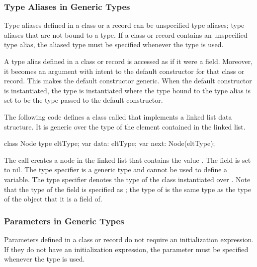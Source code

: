 \subsubsection{Type Aliases in Generic Types}
\label{Type_Aliases_in_Generic_Types}

Type aliases defined in a class or a record can be unspecified type
aliases; type aliases that are not bound to a type.  If a class or
record contains an unspecified type alias, the aliased type must be
specified whenever the type is used.

A type alias defined in a class or record is accessed as if it were a
field.  Moreover, it becomes an argument with intent  to
the default constructor for that class or record.  This makes the
default constructor generic.  When the default constructor is
instantiated, the type is instantiated where the type bound to the
type alias is set to be the type passed to the default constructor.

\begin{example}
The following code defines a class called  that implements
a linked list data structure.  It is generic over the type of the
element contained in the linked list.
\begin{chapel}
class Node {
  type eltType;
  var data: eltType;
  var next: Node(eltType);
}
\end{chapel}
The call  creates a node in the linked list
that contains the value .  The  field is set to
nil.  The type specifier  is a generic type and cannot be
used to define a variable.  The type specifier 
denotes the type of the  class instantiated over
.  Note that the type of the  field is specified
as ; the type of  is the same type as
the type of the object that it is a field of.
\end{example}

\subsubsection{Parameters in Generic Types}
\label{Parameters_in_Generic_Types}

Parameters defined in a class or record do not require an
initialization expression.  If they do not have an initialization
expression, the parameter must be specified whenever the type is used.

